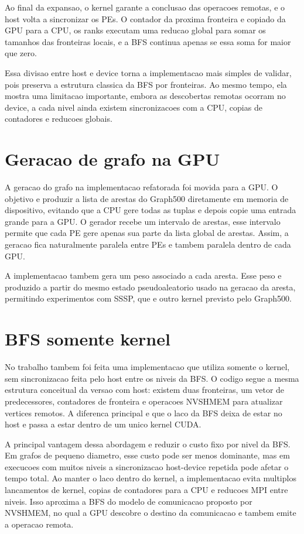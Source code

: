 \documentclass{article}
\begin{document}
Ao final da expansao, o kernel garante a conclusao das operacoes remotas, e o
host volta a sincronizar os PEs. O contador da proxima fronteira e copiado da
GPU para a CPU, os ranks executam uma reducao global para somar os tamanhos das
fronteiras locais, e a BFS continua apenas se essa soma for maior que zero.

Essa divisao entre host e device torna a implementacao mais simples de validar,
pois preserva a estrutura classica da BFS por fronteiras. Ao mesmo tempo, ela
mostra uma limitacao importante, embora as descobertas remotas ocorram no
device, a cada nivel ainda existem sincronizacoes com a CPU, copias de
contadores e reducoes globais.

\section{Geracao de grafo na GPU}
A geracao do grafo na implementacao refatorada foi movida para a GPU. O objetivo
e produzir a lista de arestas do Graph500 diretamente em memoria de dispositivo,
evitando que a CPU gere todas as tuplas e depois copie uma entrada grande para a
GPU. O gerador recebe um intervalo de arestas, esse
intervalo permite que cada PE gere apenas sua parte da lista global de arestas.
Assim, a geracao fica naturalmente paralela entre PEs e tambem paralela dentro
de cada GPU.

A implementacao tambem gera um peso associado a cada aresta. Esse peso e
produzido a partir do mesmo estado pseudoaleatorio usado na geracao da aresta,
permitindo experimentos com SSSP, que e outro kernel previsto pelo Graph500.

\section{BFS somente kernel}
No trabalho tambem foi feita uma implementacao que utiliza somente o kernel, sem
sincronizacao feita pelo host entre os niveis da BFS. O codigo segue a mesma
estrutura conceitual da versao com host: existem duas fronteiras, um vetor de
predecessores, contadores de fronteira e operacoes NVSHMEM para atualizar
vertices remotos. A diferenca principal e que o laco da BFS deixa de estar no
host e passa a estar dentro de um unico kernel CUDA.

A principal vantagem dessa abordagem e reduzir o custo fixo por nivel da BFS.
Em grafos de pequeno diametro, esse custo pode ser menos dominante, mas em
execucoes com muitos niveis a sincronizacao host-device repetida pode afetar o
tempo total. Ao manter o laco dentro do kernel, a implementacao evita multiplos
lancamentos de kernel, copias de contadores para a CPU e reducoes MPI entre
niveis. Isso aproxima a BFS do modelo de comunicacao proposto por NVSHMEM, no
qual a GPU descobre o destino da comunicacao e tambem emite a operacao remota.
\end{document}
